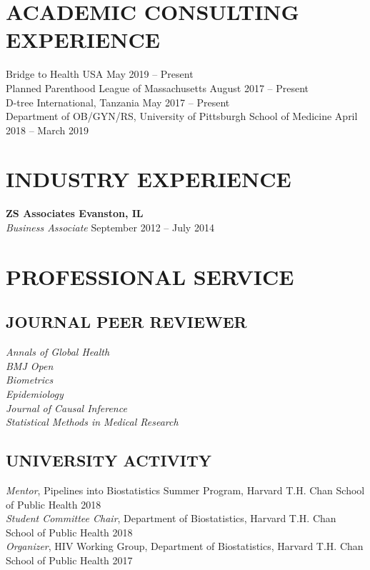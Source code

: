\documentclass[12pt]{article}
\begin{document}
\section*{\textbf{{\large A}{CADEMIC} {\large C}{ONSULTING} {\large E}{XPERIENCE}}}
Bridge to Health USA \hfill \hfill May 2019 -- Present  \\
Planned Parenthood League of Massachusetts \hfill \hfill August 2017 -- Present  \\
D-tree International, Tanzania \hfill \hfill May 2017 -- Present \\
Department of OB/GYN/RS, University of Pittsburgh School of Medicine  \hfill \hfill April 2018 -- March 2019 

\section*{\textbf{{\large I}{NDUSTRY} {\large E}{XPERIENCE}}}
\textbf{ZS Associates \hfill \hfill Evanston, IL} \\
\textit{Business Associate} \hfill \hfill September 2012 -- July 2014 

\section*{\textbf{{\large P}{ROFESSIONAL} {\large S}{ERVICE}}}
\subsection*{\textbf{JOURNAL PEER REVIEWER}}
\textit{Annals of Global Health} \\ 
\textit{BMJ Open} \\ 
\textit{Biometrics} \\
\textit{Epidemiology} \\
\textit{Journal of Causal Inference} \\ 
\textit{Statistical Methods in Medical Research}

\subsection*{\textbf{UNIVERSITY ACTIVITY}}
\textit{Mentor}, Pipelines into Biostatistics Summer Program, Harvard T.H. Chan School of
Public Health \hfill \hfill 2018 \\
\textit{Student Committee Chair}, Department of Biostatistics, Harvard T.H. Chan School of
Public Health \hfill \hfill 2018 \\
\textit{Organizer}, HIV Working Group, Department of Biostatistics, Harvard T.H. Chan School of
Public Health \hfill \hfill 2017 
\end{document}
